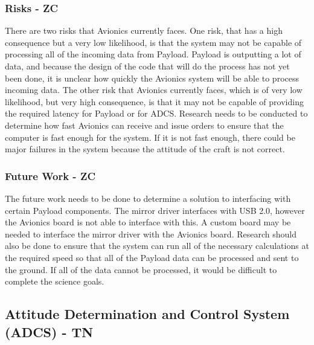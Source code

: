 \documentclass[12pt]{article}
\begin{document}
			\subsubsection{Risks - ZC}
There are two risks that Avionics currently faces. One risk, that has a high consequence but a very low likelihood, is that the system may not be capable of processing all of the incoming data from Payload. Payload is outputting a lot of data, and because the design of the code that will do the process has not yet been done, it is unclear how quickly the Avionics system will be able to process incoming data. The other risk that Avionics currently faces, which is of very low likelihood, but very high consequence, is that it may not be capable of providing the required latency for Payload or for ADCS. Research needs to be conducted to determine how fast Avionics can receive and issue orders to ensure that the computer is fast enough for the system. If it is not fast enough, there could be major failures in the system because the attitude of the craft is not correct.

			\subsubsection{Future Work - ZC}
The future work needs to be done to determine a solution to interfacing with certain Payload components. The mirror driver interfaces with USB 2.0, however the Avionics board is not able to interface with this. A custom board may be needed to interface the mirror driver with the Avionics board. Research should also be done to ensure that the system can run all of the necessary calculations at the required speed so that all of the Payload data can be processed and sent to the ground. If all of the data cannot be processed, it would be difficult to complete the science goals.


\newpage
\FloatBarrier

\subsection{Attitude Determination and Control System (ADCS) - TN} 
\end{document}

